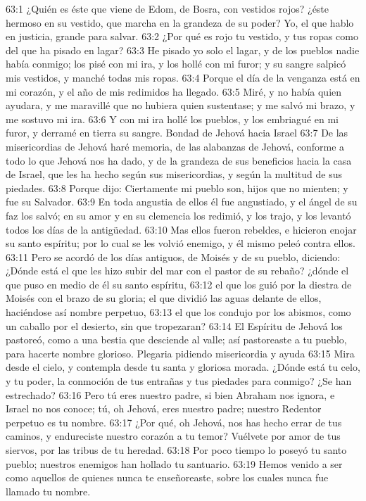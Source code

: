 63:1 ¿Quién es éste que viene de Edom, de Bosra, con vestidos rojos? ¿éste hermoso en su vestido, que marcha en la grandeza de su poder? Yo, el que hablo en justicia, grande para salvar. 
63:2 ¿Por qué es rojo tu vestido, y tus ropas como del que ha pisado en lagar? 
63:3 He pisado yo solo el lagar, y de los pueblos nadie había conmigo; los pisé con mi ira, y los hollé con mi furor; y su sangre salpicó mis vestidos, y manché todas mis ropas. 
63:4 Porque el día de la venganza está en mi corazón, y el año de mis redimidos ha llegado. 
63:5 Miré, y no había quien ayudara, y me maravillé que no hubiera quien sustentase; y me salvó mi brazo, y me sostuvo mi ira. 
63:6 Y con mi ira hollé los pueblos, y los embriagué en mi furor, y derramé en tierra su sangre. 
Bondad de Jehová hacia Israel 
63:7 De las misericordias de Jehová haré memoria, de las alabanzas de Jehová, conforme a todo lo que Jehová nos ha dado, y de la grandeza de sus beneficios hacia la casa de Israel, que les ha hecho según sus misericordias, y según la multitud de sus piedades. 
63:8 Porque dijo: Ciertamente mi pueblo son, hijos que no mienten; y fue su Salvador. 
63:9 En toda angustia de ellos él fue angustiado, y el ángel de su faz los salvó; en su amor y en su clemencia los redimió, y los trajo, y los levantó todos los días de la antigüedad. 
63:10 Mas ellos fueron rebeldes, e hicieron enojar su santo espíritu; por lo cual se les volvió enemigo, y él mismo peleó contra ellos. 
63:11 Pero se acordó de los días antiguos, de Moisés y de su pueblo, diciendo: ¿Dónde está el que les hizo subir del mar con el pastor de su rebaño? ¿dónde el que puso en medio de él su santo espíritu, 
63:12 el que los guió por la diestra de Moisés con el brazo de su gloria; el que dividió las aguas delante de ellos, haciéndose así nombre perpetuo, 
63:13 el que los condujo por los abismos, como un caballo por el desierto, sin que tropezaran? 
63:14 El Espíritu de Jehová los pastoreó, como a una bestia que desciende al valle; así pastoreaste a tu pueblo, para hacerte nombre glorioso. 
Plegaria pidiendo misericordia y ayuda 
63:15 Mira desde el cielo, y contempla desde tu santa y gloriosa morada. ¿Dónde está tu celo, y tu poder, la conmoción de tus entrañas y tus piedades para conmigo? ¿Se han estrechado? 
63:16 Pero tú eres nuestro padre, si bien Abraham nos ignora, e Israel no nos conoce; tú, oh Jehová, eres nuestro padre; nuestro Redentor perpetuo es tu nombre. 
63:17 ¿Por qué, oh Jehová, nos has hecho errar de tus caminos, y endureciste nuestro corazón a tu temor? Vuélvete por amor de tus siervos, por las tribus de tu heredad. 
63:18 Por poco tiempo lo poseyó tu santo pueblo; nuestros enemigos han hollado tu santuario. 
63:19 Hemos venido a ser como aquellos de quienes nunca te enseñoreaste, sobre los cuales nunca fue llamado tu nombre. 
